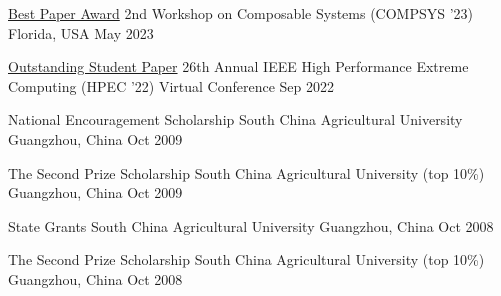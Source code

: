 



\begin{cvhonors}

  \cvhonor
    {\href{https://compsysworkshop.github.io/compsys23/program.html}{Best Paper Award}} %
    {2nd Workshop on Composable Systems (COMPSYS '23)} %
    {Florida, USA} %
    {May 2023} %

  \cvhonor
    {\href{https://ieee-hpec.org/index.php/ieee-hpec-2022-prelim-agenda/}{Outstanding Student Paper}} %
    {26th Annual IEEE High Performance Extreme Computing (HPEC '22)} %
    {Virtual Conference} %
    {Sep 2022} %

  \cvhonor
    {National Encouragement Scholarship} %
    {South China Agricultural University} %
    {Guangzhou, China} %
    {Oct 2009} %

  \cvhonor
    {The Second Prize Scholarship} %
    {South China Agricultural University (top 10\%)} %
    {Guangzhou, China} %
    {Oct 2009} %

  \cvhonor
    {State Grants} %
    {South China Agricultural University} %
    {Guangzhou, China} %
    {Oct 2008} %

  \cvhonor
    {The Second Prize Scholarship} %
    {South China Agricultural University (top 10\%)} %
    {Guangzhou, China} %
    {Oct 2008} %

\end{cvhonors}
